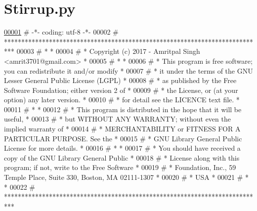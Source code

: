 \hypertarget{Stirrup_8py_source}{}\section{Stirrup.\+py}

\begin{DoxyCode}
\hypertarget{Stirrup_8py_source.tex_l00001}{}\hyperlink{namespaceStirrup}{00001} \textcolor{comment}{# -*- coding: utf-8 -*-}
00002 \textcolor{comment}{# ***************************************************************************}
00003 \textcolor{comment}{# *                                                                         *}
00004 \textcolor{comment}{# *   Copyright (c) 2017 - Amritpal Singh <amrit3701@gmail.com>             *}
00005 \textcolor{comment}{# *                                                                         *}
00006 \textcolor{comment}{# *   This program is free software; you can redistribute it and/or modify  *}
00007 \textcolor{comment}{# *   it under the terms of the GNU Lesser General Public License (LGPL)    *}
00008 \textcolor{comment}{# *   as published by the Free Software Foundation; either version 2 of     *}
00009 \textcolor{comment}{# *   the License, or (at your option) any later version.                   *}
00010 \textcolor{comment}{# *   for detail see the LICENCE text file.                                 *}
00011 \textcolor{comment}{# *                                                                         *}
00012 \textcolor{comment}{# *   This program is distributed in the hope that it will be useful,       *}
00013 \textcolor{comment}{# *   but WITHOUT ANY WARRANTY; without even the implied warranty of        *}
00014 \textcolor{comment}{# *   MERCHANTABILITY or FITNESS FOR A PARTICULAR PURPOSE.  See the         *}
00015 \textcolor{comment}{# *   GNU Library General Public License for more details.                  *}
00016 \textcolor{comment}{# *                                                                         *}
00017 \textcolor{comment}{# *   You should have received a copy of the GNU Library General Public     *}
00018 \textcolor{comment}{# *   License along with this program; if not, write to the Free Software   *}
00019 \textcolor{comment}{# *   Foundation, Inc., 59 Temple Place, Suite 330, Boston, MA  02111-1307  *}
00020 \textcolor{comment}{# *   USA                                                                   *}
00021 \textcolor{comment}{# *                                                                         *}
00022 \textcolor{comment}{# ***************************************************************************}

\end{DoxyCode}

